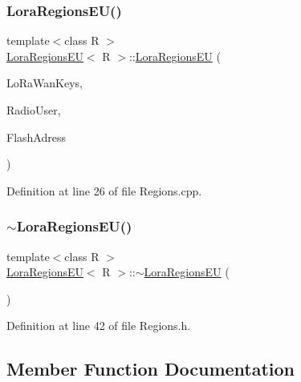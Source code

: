 \subsubsection{\texorpdfstring{Lora\+Regions\+E\+U()}{LoraRegionsEU()}}
{\footnotesize\ttfamily template$<$class R $>$ \\
\mbox{\hyperlink{class_lora_regions_e_u}{Lora\+Regions\+EU}}$<$ R $>$\+::\mbox{\hyperlink{class_lora_regions_e_u}{Lora\+Regions\+EU}} (\begin{DoxyParamCaption}\item[{\mbox{\hyperlink{structs_lo_ra_wan_keys}{s\+Lo\+Ra\+Wan\+Keys}}}]{Lo\+Ra\+Wan\+Keys,  }\item[{R $\ast$}]{Radio\+User,  }\item[{uint32\+\_\+t}]{Flash\+Adress }\end{DoxyParamCaption})}



Definition at line 26 of file Regions.\+cpp.

\mbox{\label{class_lora_regions_e_u_a7b420653e64fa700d76181d561eb4ca9}} 
\subsubsection{\texorpdfstring{$\sim$\+Lora\+Regions\+E\+U()}{~LoraRegionsEU()}}
{\footnotesize\ttfamily template$<$class R $>$ \\
\mbox{\hyperlink{class_lora_regions_e_u}{Lora\+Regions\+EU}}$<$ R $>$\+::$\sim$\mbox{\hyperlink{class_lora_regions_e_u}{Lora\+Regions\+EU}} (\begin{DoxyParamCaption}\item[{void}]{ }\end{DoxyParamCaption})\hspace{0.3cm}{\ttfamily [inline]}}



Definition at line 42 of file Regions.\+h.



\subsection{Member Function Documentation}
\mbox{\label{class_lora_regions_e_u_af19055a7f2df125b3937ebaf033f50af}} 
